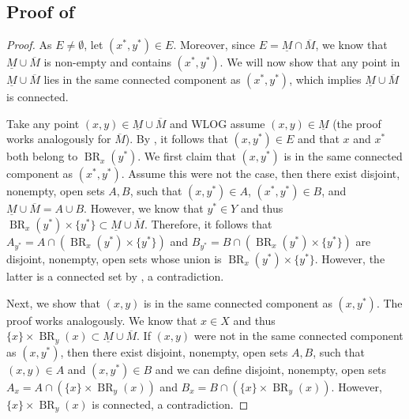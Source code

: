 \documentclass{article}
\DeclareMathOperator{\BR}{BR}
\begin{document}
\subsection{Proof of }

\label{sec:proof:stackelberg}
\begin{proof}

   As $E\neq \emptyset$, let $(x^*,y^*)\in E$. Moreover, since $E=\underline{M}\cap \overline{M}$, we know that $\underline{M}\cup\overline{M}$ is non-empty and contains $(x^*,y^*)$. We will now show that any point in $\underline{M}\cup\overline{M}$ lies in the same connected component as $(x^*,y^*)$, which implies $\underline{M}\cup\overline{M}$ is connected.

   Take any point $(x,y)\in \underline{M}\cup\overline{M}$ and WLOG assume $(x,y)\in \underline{M}$ (the proof works analogously for $\overline{M}$). By , it follows that $(x,y^*)\in E$ and that $x$ and $x^*$ both belong to $\BR_x(y^*)$. We first claim that $(x,y^*)$ is in the same connected component as $(x^*,y^*)$. Assume this were not the case, then there exist disjoint, nonempty, open sets $A,B$, such that $(x,y^*)\in A$, $(x^*,y^*)\in B$, and $\underline{M}\cup\overline{M}=A\cup B$. However, we know that $y^*\in Y$ and thus $\BR_x(y^*)\times \{y^*\} \subset \underline{M}\cup\overline{M}$. Therefore, it follows that $A_{y^*}=A \cap \left(\BR_x(y^*)\times \{y^*\}\right)$ and $B_{y^*}=B \cap \left(\BR_x(y^*)\times \{y^*\}\right)$ are disjoint, nonempty, open sets whose union is $\BR_x(y^*)\times \{y^*\}$. However, the latter is a connected set by , a contradiction.

   Next, we show that $(x,y)$ is in the same connected component as $(x,y^*)$. The proof works analogously. We know that $x\in X$ and thus $\{x\} \times \BR_y(x)\subset \underline{M}\cup\overline{M}$. If $(x,y)$ were not in the same connected component as $(x,y^*)$, then there exist disjoint, nonempty, open sets $A,B$, such that $(x,y)\in A$ and $(x,y^*)\in B$ and we can define disjoint, nonempty, open sets $A_{x}=A \cap \left(\{x\} \times \BR_y(x)\right)$ and $B_{x}=B \cap \left(\{x\} \times \BR_y(x)\right)$. However, $\{x\} \times \BR_y(x)$ is connected, a contradiction.
\end{proof}
\end{document}

